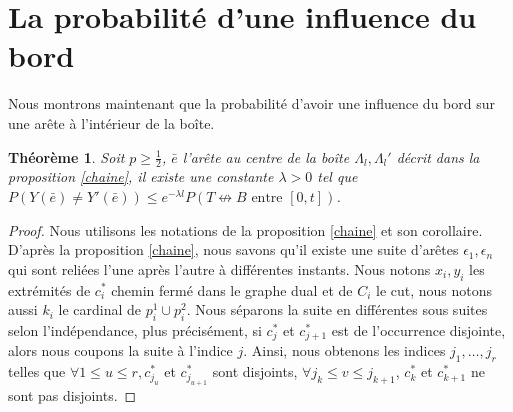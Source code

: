 \documentclass[titlepage,a4paper,12pt]{article}
\newcounter{thm}
\newcounter{prop}
\newcounter{cor}
\newtheorem{cvg}[thm]{Théorème}
\newcommand{\nconnect}{\nleftrightarrow}
\begin{document}
\section{La probabilité d'une influence du bord}

Nous montrons maintenant que la probabilité d'avoir une influence du bord sur une arête à l'intérieur de la boîte. 
\begin{cvg}
Soit $p\geqslant \frac{1}{2}$, $\bar{e}$ l'arête au centre de la boîte $\Lambda_l, \Lambda_l'$ décrit dans la proposition \ref{chaine}, il existe une constante $\lambda> 0$ tel que $P(Y(\bar{e})\neq Y'(\bar{e})) \leqslant e^{-\lambda l} P(T\nconnect B \text{ entre }[0,t])$.
\end{cvg}

\begin{proof}

Nous utilisons les notations de la proposition \ref{chaine} et son corollaire.
D'après la proposition \ref{chaine}, nous savons qu'il existe une suite d'arêtes $\epsilon_1,\epsilon_n$ qui sont reliées l'une après l'autre à différentes instants. Nous notons $x_i,y_i$ les extrémités de $c_i^*$ chemin fermé dans le graphe dual et de $C_i$ le cut, nous notons aussi $k_i$ le cardinal de $p_i^1\cup p_i^2$. Nous séparons la suite en différentes sous suites selon l'indépendance, plus précisément, si $c^*_j$ et $c^*_{j+1}$  est de l'occurrence disjointe, alors nous coupons la suite à l'indice $j$. Ainsi, nous obtenons les indices $j_1,\dots,j_r$ telles que $\forall 1\leqslant u\leqslant r, c^*_{j_u}$ et $c^*_{j_{u+1}}$ sont disjoints, $\forall j_k \leqslant v \leqslant j_{k+1}$, $c_k^*$ et $c_{k+1}^*$ ne sont pas disjoints.


\end{proof}
\end{document}
